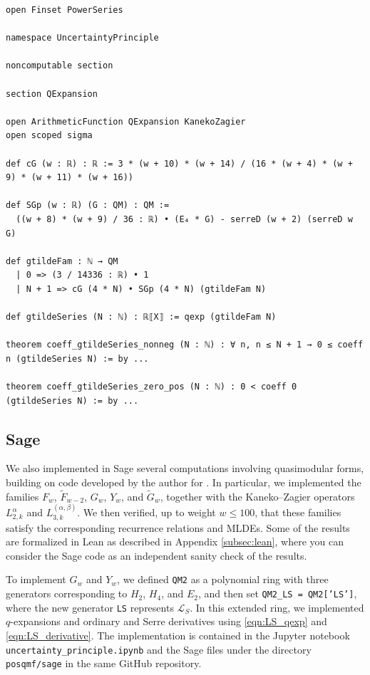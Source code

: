 \documentclass[10pt,reqno]{amsproc}
\newcommand{\wtilde}{\widetilde}
\newcommand{\cL}{\mathcal{L}}
\newcommand{\1}{\mathds{1}}	%
\theoremstyle{definition}
\theoremstyle{remark}
\begin{document}
\begin{lstlisting}[language=lean]
open Finset PowerSeries

namespace UncertaintyPrinciple

noncomputable section

section QExpansion

open ArithmeticFunction QExpansion KanekoZagier
open scoped sigma

def cG (w : ℝ) : ℝ := 3 * (w + 10) * (w + 14) / (16 * (w + 4) * (w + 9) * (w + 11) * (w + 16))

def SGp (w : ℝ) (G : QM) : QM :=
  ((w + 8) * (w + 9) / 36 : ℝ) • (E₄ * G) - serreD (w + 2) (serreD w G)

def gtildeFam : ℕ → QM
  | 0 => (3 / 14336 : ℝ) • 1
  | N + 1 => cG (4 * N) • SGp (4 * N) (gtildeFam N)

def gtildeSeries (N : ℕ) : ℝ⟦X⟧ := qexp (gtildeFam N)

theorem coeff_gtildeSeries_nonneg (N : ℕ) : ∀ n, n ≤ N + 1 → 0 ≤ coeff n (gtildeSeries N) := by ...

theorem coeff_gtildeSeries_zero_pos (N : ℕ) : 0 < coeff 0 (gtildeSeries N) := by ...
\end{lstlisting}

\subsection{Sage}
\label{subsec:sage}

We also implemented in Sage several computations involving quasimodular forms, building on code developed by the author for \cite[Appendix~A]{lee2024algebraic}.
In particular, we implemented the families $F_w$, $\wtilde{F}_{w-2}$, $G_w$, $Y_w$, and $\wtilde{G}_w$, together with the Kaneko--Zagier operators $L_{2,k}^{\alpha}$ and $L_{3,k}^{(\alpha,\beta)}$.
We then verified, up to weight $w \le 100$, that these families satisfy the corresponding recurrence relations and MLDEs.
Some of the results are formalized in Lean as described in Appendix \ref{subsec:lean}, where you can consider the Sage code as an independent sanity check of the results.

To implement $G_w$ and $Y_w$, we defined \texttt{QM2} as a polynomial ring with three generators corresponding to $H_2$, $H_4$, and $E_2$, and then set \texttt{QM2\_LS = QM2['LS']}, where the new generator \texttt{LS} represents $\cL_S$.
In this extended ring, we implemented $q$-expansions and ordinary and Serre derivatives using \eqref{eqn:LS_qexp} and \eqref{eqn:LS_derivative}.
The implementation is contained in the Jupyter notebook \texttt{uncertainty\_principle.ipynb} and the Sage files under the directory \texttt{posqmf/sage} in the same GitHub repository.




\end{document}
